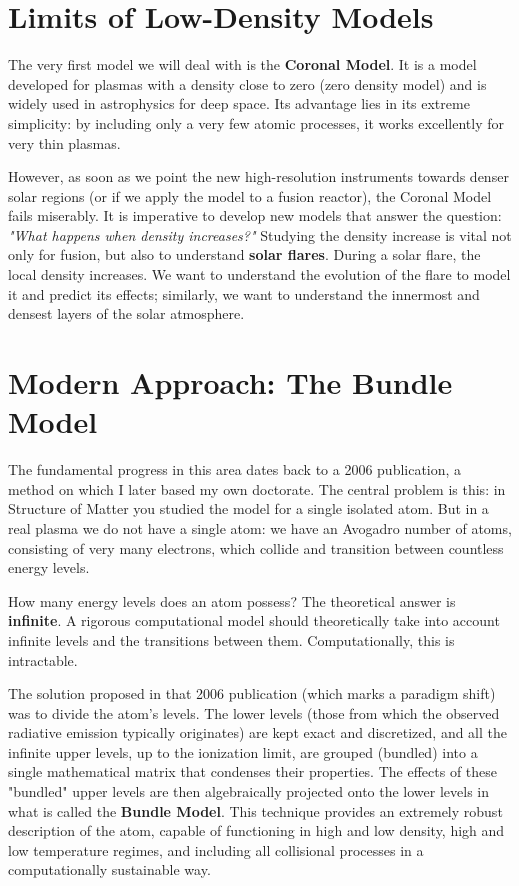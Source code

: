 \section{Limits of Low-Density Models}

The very first model we will deal with is the \textbf{Coronal Model}. It is a model developed for plasmas with a density close to zero (zero density model) and is widely used in astrophysics for deep space. Its advantage lies in its extreme simplicity: by including only a very few atomic processes, it works excellently for very thin plasmas.

However, as soon as we point the new high-resolution instruments towards denser solar regions (or if we apply the model to a fusion reactor), the Coronal Model fails miserably. It is imperative to develop new models that answer the question: \textit{"What happens when density increases?"}
Studying the density increase is vital not only for fusion, but also to understand \textbf{solar flares}. During a solar flare, the local density increases. We want to understand the evolution of the flare to model it and predict its effects; similarly, we want to understand the innermost and densest layers of the solar atmosphere.

\section{Modern Approach: The Bundle Model}

The fundamental progress in this area dates back to a 2006 publication, a method on which I later based my own doctorate.
The central problem is this: in Structure of Matter you studied the model for a single isolated atom. But in a real plasma we do not have a single atom: we have an Avogadro number of atoms, consisting of very many electrons, which collide and transition between countless energy levels.

How many energy levels does an atom possess?
The theoretical answer is \textbf{infinite}.
A rigorous computational model should theoretically take into account infinite levels and the transitions between them. Computationally, this is intractable.

The solution proposed in that 2006 publication (which marks a paradigm shift) was to divide the atom's levels. The lower levels (those from which the observed radiative emission typically originates) are kept exact and discretized, and all the infinite upper levels, up to the ionization limit, are grouped (bundled) into a single mathematical matrix that condenses their properties.
The effects of these "bundled" upper levels are then algebraically projected onto the lower levels in what is called the \textbf{Bundle Model}. This technique provides an extremely robust description of the atom, capable of functioning in high and low density, high and low temperature regimes, and including all collisional processes in a computationally sustainable way.

